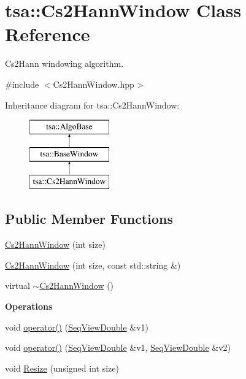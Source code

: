\hypertarget{classtsa_1_1_cs2_hann_window}{}\section{tsa\+:\+:Cs2\+Hann\+Window Class Reference}
\label{classtsa_1_1_cs2_hann_window}


Cs2\+Hann windowing algorithm.  




{\ttfamily \#include $<$Cs2\+Hann\+Window.\+hpp$>$}

Inheritance diagram for tsa\+:\+:Cs2\+Hann\+Window\+:\begin{figure}[H]
\begin{center}
\leavevmode
\includegraphics[height=3.000000cm]{classtsa_1_1_cs2_hann_window}
\end{center}
\end{figure}
\subsection*{Public Member Functions}
\begin{DoxyCompactItemize}
\item 
\hyperlink{classtsa_1_1_cs2_hann_window_aaa914c46b51ba07093b04a473a164699}{Cs2\+Hann\+Window} (int size)
\item 
\hyperlink{classtsa_1_1_cs2_hann_window_ac32bd6fa3481fd94c0729d6a77ca52c7}{Cs2\+Hann\+Window} (int size, const std\+::string \&)
\item 
virtual \hyperlink{classtsa_1_1_cs2_hann_window_ae46ac2cfdbfc9bef375e0cab72e379e2}{$\sim$\+Cs2\+Hann\+Window} ()
\end{DoxyCompactItemize}
\begin{Indent}\textbf{ Operations}\par
\begin{DoxyCompactItemize}
\item 
void \hyperlink{classtsa_1_1_cs2_hann_window_af896b6c2dc55a283b67c2b694926918a}{operator()} (\hyperlink{namespacetsa_ac599574bcc094eda25613724b8f3ca9e}{Seq\+View\+Double} \&v1)
\item 
void \hyperlink{classtsa_1_1_cs2_hann_window_adc0b74ee1e5173f5de7f86cf714fe47f}{operator()} (\hyperlink{namespacetsa_ac599574bcc094eda25613724b8f3ca9e}{Seq\+View\+Double} \&v1, \hyperlink{namespacetsa_ac599574bcc094eda25613724b8f3ca9e}{Seq\+View\+Double} \&v2)
\item 
void \hyperlink{classtsa_1_1_cs2_hann_window_a540187b8c32000d00d3023e8f8418264}{Resize} (unsigned int size)
\end{DoxyCompactItemize}
\end{Indent}

